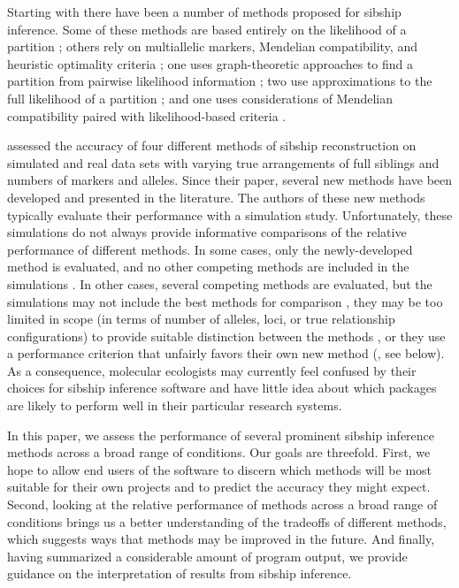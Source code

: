 Starting with \citet{painter97} there have been a number of methods proposed for sibship inference.  
Some of these methods are based entirely on the likelihood of a partition 
\citep{painter97,thomas02,wang04,wang09}; others rely on multiallelic markers, Mendelian compatibility, 
and heuristic optimality criteria \citep{konovalov04,bergerwolf07,sheik08}; one  uses graph-theoretic 
approaches to find a partition from pairwise likelihood information \citep{beyer03}; two use 
approximations to the full likelihood of a partition \citep{Smithetal2001,Wang2012pairwise}; and one 
uses considerations of Mendelian compatibility paired with likelihood-based criteria 
\citep{almudevar99}. 

\citet{butler04} assessed the accuracy of four different methods of sibship reconstruction on simulated 
and real data sets with varying true arrangements of full siblings and numbers of markers and alleles. 
Since their paper, several new methods have been developed and presented in the literature.  The 
authors of these new methods typically evaluate their performance with a simulation study.  
Unfortunately, these simulations do not always provide informative comparisons of the relative 
performance of different methods. In some cases, only the newly-developed method is evaluated, and no 
other competing methods are included in the simulations \citep{beyer03,wang04,wang09}.  In other cases, 
several competing methods are evaluated, but the simulations may not include the best methods for 
comparison \citep{bergerwolf07}, they may be too limited in scope (in terms of number of alleles, loci, 
or true relationship configurations) to provide suitable distinction between the methods 
\citep{alm&and11,ashley09}, or they use a performance criterion that unfairly favors their own new 
method (\citealt{bergerwolf07,chaovalitwongse07,ashley09}, see below).  As a consequence, molecular 
ecologists may currently feel confused by their choices for sibship inference software and have little 
idea about which packages are likely to perform well in their particular research systems. 

In this paper, we assess the performance of several prominent sibship inference methods across a broad 
range of conditions.  Our goals are threefold. First, we hope to allow end users of the software to 
discern which methods will be most suitable for their own projects and to predict the accuracy they 
might expect.  Second, looking at the relative performance of methods across a broad range of 
conditions brings us a better understanding of the tradeoffs of different methods, which suggests ways 
that methods may be improved in the future. And finally, having summarized a considerable amount of 
program output, we provide guidance on the interpretation of results from sibship inference.
  

